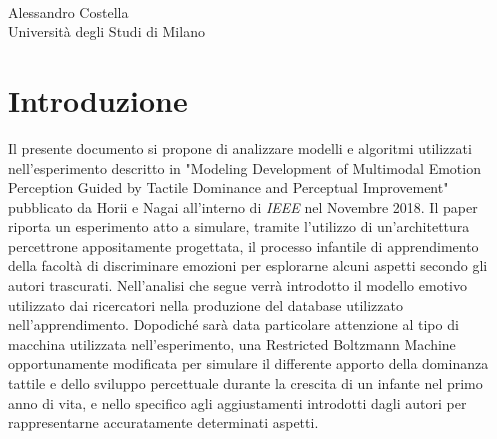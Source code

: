 \documentclass[10pt,letterpaper]{article}
\begin{document}
\vspace*{0.2in}

\begin{flushleft}
\begin{center}
\centering
{\Large
\textbf{
}}
\newline
\\
Alessandro Costella
\\
\bigskip
 Università degli Studi di Milano
\\
\bigskip

\end{center}
\end{flushleft}


\section{Introduzione}
Il presente documento si propone di analizzare modelli e algoritmi utilizzati nell'esperimento descritto in "Modeling Development of Multimodal Emotion Perception Guided by Tactile Dominance and Perceptual Improvement" pubblicato da Horii e Nagai all'interno di \textit{IEEE} nel Novembre 2018. Il paper riporta un esperimento atto a simulare, tramite l'utilizzo di un'architettura percettrone appositamente progettata, il processo infantile di apprendimento della facoltà di discriminare emozioni per esplorarne alcuni aspetti secondo gli autori trascurati. Nell'analisi che segue verrà introdotto il modello emotivo utilizzato dai ricercatori nella produzione del database utilizzato nell'apprendimento. Dopodiché sarà data particolare attenzione al tipo di macchina utilizzata nell'esperimento, una Restricted Boltzmann Machine opportunamente modificata per simulare il differente apporto della dominanza tattile e dello sviluppo percettuale durante la crescita di un infante nel primo anno di vita, e nello specifico agli aggiustamenti introdotti dagli autori per rappresentarne accuratamente determinati aspetti.
\end{document}
